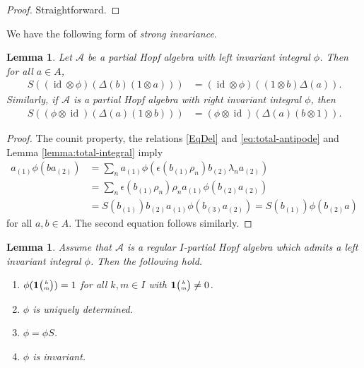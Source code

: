 \documentclass[10pt]{article}
\DeclareMathOperator{\id}{id}
\newcommand{\Grt}[3]{#1{\tiny {\begin{pmatrix} #2\\#3\end{pmatrix}}}}
\newcommand{\UnitC}[2]{\Grt{\mathbf{1}}{#1}{#2}}
\newtheorem{Lem}[Theorem]{Lemma}
\theoremstyle{definition}
\numberwithin{equation}{section}
\begin{document}
\begin{proof}
  Straightforward.
\end{proof}

We have the following form of \emph{strong invariance}.

\begin{Lem} \label{lemma:strong-invariance}
  Let $\mathscr{A}$ be a partial Hopf algebra with left invariant integral $\phi$. Then
  for all $a\in A$,
  \begin{align*}
    S\left(( \id\otimes
    \phi)(\Delta(b)(1 \otimes a))\right) &= (\id \otimes \phi)((1 \otimes b)\Delta(a)).
  \end{align*}
  Similarly, if $\mathscr{A}$ is a partial Hopf algebra with right invariant integral $\phi$, then 
   \begin{align*} S\left((\phi \otimes
    \id)(\Delta(a)(1\otimes b))\right) &= (\phi \otimes \id)(\Delta(a)(b \otimes 1)).\end{align*}
\end{Lem}
\begin{proof}
 The counit property, the relations \eqref{EqDel} and
 \eqref{eq:total-antipode} and Lemma \ref{lemma:total-integral} imply
  \begin{align*}
    a_{(1)}\phi(ba_{(2)}) &= \sum_{n}
    a_{(1)}\phi(\epsilon(b_{(1)}\rho_{n})b_{(2)}\lambda_{n}a_{(2)}) \\
&= \sum_{n} \epsilon(b_{(1)}\rho_{n})\rho_{n}a_{(1)}\phi(b_{(2)}a_{(2)})
\\
&= S(b_{(1)})b_{(2)}a_{(1)}\phi(b_{(3)}a_{(2)}) =
S(b_{(1)})\phi(b_{(2)}a)
  \end{align*}
for all $a,b \in A$. The second equation 
follows similarly.
\end{proof}

\begin{Lem} Assume that $\mathscr{A}$ is a regular  $I$-partial Hopf algebra which admits a left invariant integral $\phi$. Then the following hold.
\begin{enumerate}[label = {(\arabic*)}]
\item\label{LI1} $\phi(\UnitC{k}{m})=1$ for all $k,m\in I$ with $\UnitC{k}{m}\neq 0$.
\item\label{LI2} $\phi$ is uniquely determined.
\item\label{LI3} $\phi=\phi S$.
\item\label{LI4} $\phi$ is invariant.
\end{enumerate}
\end{Lem}
\end{document}
